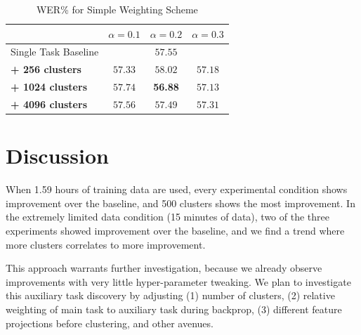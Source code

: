 \documentclass[a4paper]{article}
\begin{document}
\begin{table}[!htbp]
  \centering
  \caption{WER\% for Simple Weighting Scheme}
  \begin{adjustbox}{width=\textwidth}
    \begin{tabular}{lccc}
      \toprule
      & $\alpha = 0.1 $ & $\alpha = 0.2 $ & $\alpha = 0.3 $\\
      \midrule
      Single Task Baseline  &  \multicolumn{3}{c}{$57.55$ \raisebox{.33\height}{\footnotesize{$\pm 1.82$}}}     \\
      
      \textbf{+ 256 clusters}  &  $57.33$ \raisebox{.33\height}{\footnotesize{$\pm 2.49$}}   &  $58.02$ \raisebox{.33\height}{\footnotesize{$\pm 2.09$}}     & $57.18$ \raisebox{.33\height}{\footnotesize{$\pm 0.56$}} \\
      
      \textbf{+ 1024 clusters}   & $ 57.74$ \raisebox{.33\height}{\footnotesize{$\pm 3.06$}}    & \textbf{56.88}  \raisebox{.33\height}{\footnotesize{$\pm 1.33$}}    & $57.13  $ \raisebox{.33\height}{\footnotesize{$\pm 1.55$}}  \\
      
      \textbf{+ 4096 clusters}   &  $57.56$ \raisebox{.33\height}{\footnotesize{$\pm 2.53$}}  & $57.49$ \raisebox{.33\height}{\footnotesize{$\pm  3.17$}}   &  $57.31$ \raisebox{.33\height}{\footnotesize{$\pm 1.31$}}  \\
      \bottomrule
    \end{tabular}
  \end{adjustbox}
\end{table}

\section{Discussion}


When 1.59 hours of training data are used, every experimental condition shows improvement over the baseline, and 500 clusters shows the most improvement. In the extremely limited data condition (15 minutes of data), two of the three experiments showed improvement over the baseline, and we find a trend where more clusters correlates to more improvement.

This approach warrants further investigation, because we already observe improvements with very little hyper-parameter tweaking. We plan to investigate this auxiliary task discovery by adjusting (1) number of clusters, (2) relative weighting of main task to auxiliary task during backprop, (3) different feature projections before clustering, and other avenues.
\end{document}
